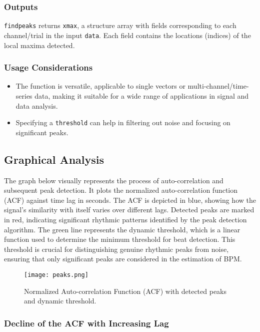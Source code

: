 \subsubsection{Outputs}

\texttt{findpeaks} returns \texttt{xmax}, a structure array with fields corresponding to each channel/trial in the input \texttt{data}. Each field contains the locations (indices) of the local maxima detected.

\subsubsection{Usage Considerations}

\begin{itemize}
    \item The function is versatile, applicable to single vectors or multi-channel/time-series data, making it suitable for a wide range of applications in signal and data analysis.
    \item Specifying a \texttt{threshold} can help in filtering out noise and focusing on significant peaks.
\end{itemize}

\subsection{Graphical Analysis}

The graph below visually represents the process of auto-correlation and subsequent peak detection. It plots the normalized auto-correlation function (ACF) against time lag in seconds. The ACF is depicted in blue, showing how the signal's similarity with itself varies over different lags. Detected peaks are marked in red, indicating significant rhythmic patterns identified by the peak detection algorithm. The green line represents the dynamic threshold, which is a linear function used to determine the minimum threshold for beat detection. This threshold is crucial for distinguishing genuine rhythmic peaks from noise, ensuring that only significant peaks are considered in the estimation of BPM.

\begin{figure}[H]
    \centering
    \texttt{[image: peaks.png]}
    \caption{Normalized Auto-correlation Function (ACF) with detected peaks and dynamic threshold.}
\end{figure}

\subsubsection{Decline of the ACF with Increasing Lag}

